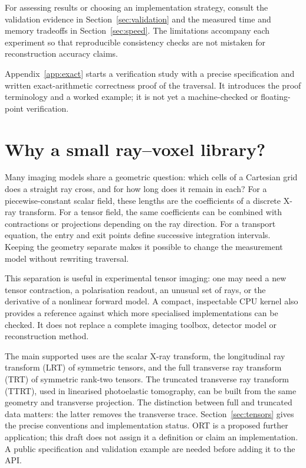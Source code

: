 \documentclass[11pt,a4paper]{article}
\begin{document}
For assessing results or choosing an implementation strategy, consult the
validation evidence in Section~\ref{sec:validation} and the measured time
and memory tradeoffs in Section~\ref{sec:speed}. The limitations accompany
each experiment so that reproducible consistency checks are not mistaken
for reconstruction accuracy claims.

Appendix~\ref{app:exact} starts a verification study with a precise
specification and written exact-arithmetic correctness proof of the
traversal. It introduces the proof terminology and a worked example;
it is not yet a machine-checked or floating-point verification.

\clearpage
\begingroup
\small
\tableofcontents
\endgroup
\clearpage

\section{Why a small ray--voxel library?}
Many imaging models share a geometric question: which cells of a Cartesian
grid does a straight ray cross, and for how long does it remain in each?
For a piecewise-constant scalar field, these lengths are the coefficients
of a discrete X-ray transform. For a tensor field, the same coefficients
can be combined with contractions or projections depending on the ray
direction. For a transport equation, the entry and exit points define
successive integration intervals. Keeping the geometry separate makes it
possible to change the measurement model without rewriting traversal.

This separation is useful in experimental tensor imaging: one may need a
new tensor contraction, a polarisation readout, an unusual set of rays, or
the derivative of a nonlinear forward model. A compact, inspectable CPU
kernel also provides a reference against which more specialised
implementations can be checked. It does not replace a complete imaging
toolbox, detector model or reconstruction method.

The main supported uses are the scalar X-ray transform, the longitudinal
ray transform (LRT) of symmetric tensors, and the full transverse ray
transform (TRT) of symmetric rank-two tensors. The truncated transverse ray
transform (TTRT), used in linearised photoelastic tomography, can be built
from the same geometry and transverse projection. The distinction between
full and truncated data matters: the latter removes the transverse trace.
Section~\ref{sec:tensors} gives the precise conventions and implementation
status. ORT is a proposed further application; this draft does not assign
it a definition or claim an implementation. A public specification and
validation example are needed before adding it to the API.
\end{document}
